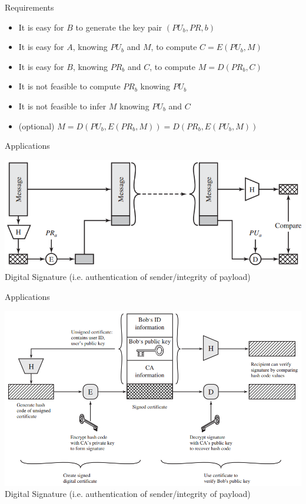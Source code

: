 \documentclass{beamer}
\begin{document}
\begin{frame}{Requirements}
  \begin{itemize}
    \item It is easy for $B$ to generate the key pair $(PU_b,PR,b)$
    \item It is easy for $A$, knowing $PU_b$ and $M$, to compute $C=E(PU_b, M)$ 
    \item It is easy for $B$, knowing $PR_b$ and $C$, to compute $M=D(PR_b, C)$ 
    \item It is not feasible to compute $PR_b$ knowing $PU_b$ 
    \item It is not feasible to infer $M$ knowing $PU_b$ and $C$
    \item (optional) $M=D(PU_b,E(PR_b,M))=D(PR_b,E(PU_b,M))$
  \end{itemize}
\end{frame}
 

\begin{frame}{Applications}
  \begin{center}
    \includegraphics[width=0.8\linewidth]{signature}\\
  Digital Signature (i.e. authentication of sender/integrity of payload)
  \end{center}
\end{frame}
 
\begin{frame}{Applications}
  \begin{center}
    \includegraphics[width=0.8\linewidth]{certificate}\\
  Digital Signature (i.e. authentication of sender/integrity of payload)
  \end{center}
\end{frame}
\end{document}
